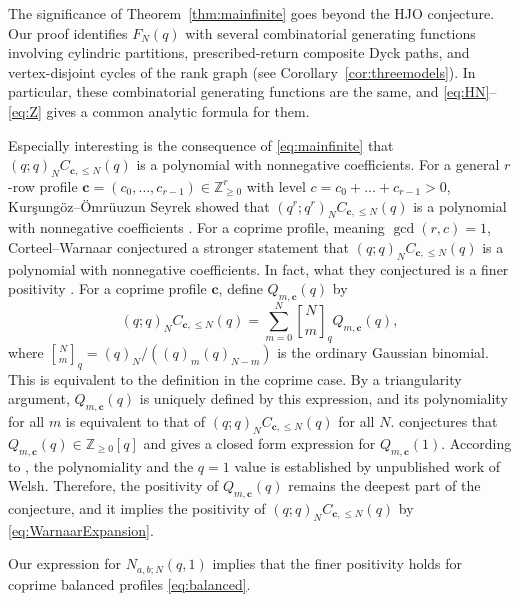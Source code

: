 \documentclass[12pt,reqno]{amsart}
\numberwithin{equation}{section}
\theoremstyle{definition}
\theoremstyle{remark}
\theoremstyle{plain}
\newcommand{\NN}{\mathbb Z_{\ge0}}
\newcommand{\cc}{\mathbf c}
\newcommand{\qbin}[2]{\genfrac{[}{]}{0pt}{}{#1}{#2}_{q}}
\begin{document}
The significance of Theorem~\ref{thm:mainfinite} goes beyond the HJO conjecture. Our proof identifies $F_N(q)$ with several combinatorial generating functions involving cylindric partitions, prescribed-return composite Dyck paths, and vertex-disjoint cycles of the rank graph (see Corollary~\ref{cor:threemodels}). In particular, these combinatorial generating functions are the same, and \eqref{eq:HN}--\eqref{eq:Z} gives a common analytic formula for them. 

Especially interesting is the consequence of \eqref{eq:mainfinite} that $(q;q)_NC_{\cc,\le N}(q)$ is a polynomial with nonnegative coefficients. For a general $r$-row profile $\cc=(c_0,\dots,c_{r-1})\in \NN^r$ with level $c=c_0+\dots+c_{r-1}>0$, Kur\c{s}ung\"oz--\"Omr\"uuzun Seyrek showed that $(q^r;q^r)_NC_{\cc,\le N}(q)$ is a polynomial with nonnegative coefficients
\cite[(2), arXiv version~2]{KOS}. For a coprime profile, meaning $\gcd(r,c)=1$, Corteel--Warnaar conjectured a stronger statement that $(q;q)_NC_{\cc,\le N}(q)$ is a polynomial with nonnegative coefficients. In fact, what they conjectured is a finer positivity \cite[Conjecture~8.4]{Warnaar}. For a coprime profile $\cc$, define $Q_{m,\cc}(q)$ by
\begin{equation}\label{eq:WarnaarExpansion}
 (q;q)_N C_{\cc,\le N}(q)
   =\sum_{m=0}^N\qbin Nm Q_{m,\cc}(q),
\end{equation}
where $\qbin Nm=(q)_N/((q)_m(q)_{N-m})$ is the ordinary Gaussian
binomial. This is equivalent to the definition \cite[(2.4)]{Warnaar} in the coprime case. By a triangularity argument, $Q_{m,\cc}(q)$ is uniquely defined by this expression, and its polynomiality for all $m$ is equivalent to that of $(q;q)_N C_{\cc,\le N}(q)$ for all $N$. \cite[Conjecture~8.4]{Warnaar} conjectures that $Q_{m,\cc}(q)\in \NN[q]$ and gives a closed form expression for $Q_{m,\cc}(1)$. According to \cite[following Conjecture~8.4]{Warnaar}, the polynomiality and the $q=1$ value is established by unpublished work of Welsh. Therefore, the positivity of $Q_{m,\cc}(q)$ remains the deepest part of the conjecture, and it implies the positivity of $(q;q)_NC_{\cc,\le N}(q)$ by \eqref{eq:WarnaarExpansion}.

Our expression for $N_{a,b;N}(q,1)$ implies that the finer positivity holds for coprime balanced profiles \eqref{eq:balanced}.
\end{document}
